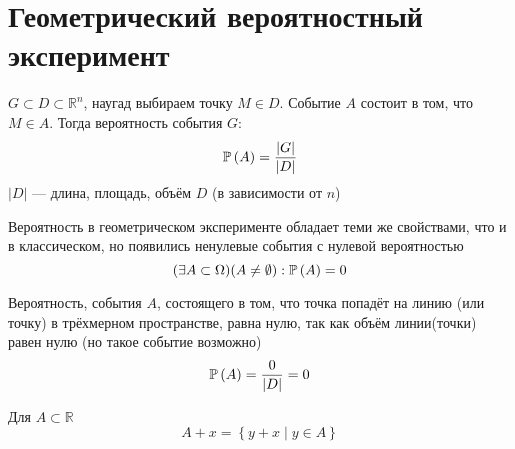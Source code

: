 \section{Геометрический вероятностный эксперимент}
\begin{example}
    $G\subset D\subset \mathbb{R}^n$, наугад выбираем точку $M\in D$. Событие $A$ состоит в том, что $M\in A$. Тогда вероятность события $G$:
    $$\mathbb{P}\left( A \right)=\frac{\left|G\right|}{\left|D\right|}$$
    $\left|D\right|$ --- длина, площадь, объём $D$ (в зависимости от $n$)
\end{example}
Вероятность в геометрическом эксперименте обладает теми же свойствами, что и в классическом, но появились ненулевые события с нулевой вероятностью
$$(\exists A\subset\Omega)(A\neq\emptyset): \mathbb{P}\left( A \right)=0$$
\begin{example}
    Вероятность, события $A$, состоящего в том,
    что точка попадёт на линию (или точку) в трёхмерном пространстве,
    равна нулю, так как объём линии(точки) равен нулю
    (но такое событие возможно)
    $$\mathbb{P}\left( A \right)=\frac{0}{\left|D\right|}=0$$
\end{example}

\begin{definition}
    Для $A\subset\mathbb{R}$
    $$A+x=\left\{y+x\mid y\in A\right\}$$
\end{definition}

